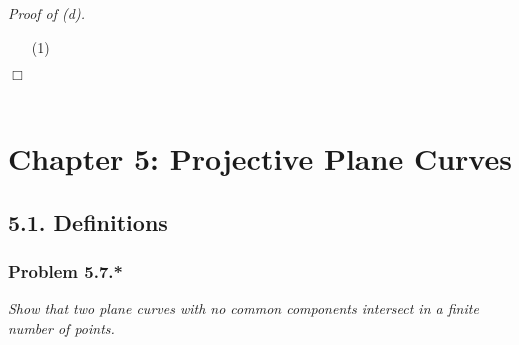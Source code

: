 \documentclass{article}
\begin{document}
\emph{Proof of (d).}
\begin{enumerate}
\item[(1)]
\end{enumerate}
$\Box$ \\\\






\newpage
\section*{Chapter 5: Projective Plane Curves\\}



\subsection*{5.1. Definitions \\}






\subsubsection*{Problem 5.7.*}
\emph{Show that two plane curves with no common components intersect in
a finite number of points.} \\
\end{document}
